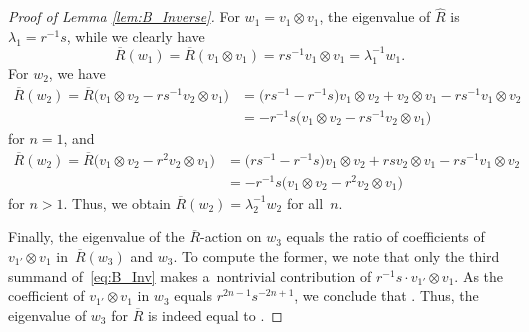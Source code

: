 \documentclass[10pt,a4paper]{amsart}
\numberwithin{equation}{section}
\begin{document}
\begin{proof}[Proof of Lemma \ref{lem:B_Inverse}]
For $w_{1} = v_{1} \otimes v_{1}$, the eigenvalue of $\hat{R}$ is $\lambda_1=r^{-1}s$, while we clearly have
\begin{displaymath}
 \overline{R}(w_1)=\overline{R}(v_{1} \otimes v_{1}) = rs^{-1} v_{1} \otimes v_{1}=\lambda^{-1}_1 w_1 .
\end{displaymath}
For $w_{2}$, we have
\begin{displaymath}
\begin{split}
 \overline{R}(w_{2}) = \overline{R}\bigl(v_{1} \otimes v_{2} - rs^{-1}v_{2} \otimes v_{1}\bigr) &=
 \bigl(rs^{-1} - r^{-1}s\bigr)v_{1} \otimes v_{2} + v_{2} \otimes v_{1} - rs^{-1}v_{1} \otimes v_{2} \\
 &=
 -r^{-1}s\bigl(v_{1} \otimes v_{2} - rs^{-1}v_{2} \otimes v_{1}\bigr)
\end{split}
\end{displaymath}
for $n = 1$, and
\begin{displaymath}
\begin{split}
 \overline{R}(w_{2}) = \overline{R}\bigl(v_{1} \otimes v_{2} - r^{2}v_{2} \otimes v_{1}\bigr) &=
 \bigl(rs^{-1} - r^{-1}s\bigr)v_{1} \otimes v_{2} + rsv_{2} \otimes v_{1} - rs^{-1}v_{1} \otimes v_{2} \\
 &=
 -r^{-1}s\bigl(v_{1} \otimes v_{2} - r^{2}v_{2} \otimes v_{1}\bigr)
\end{split}
\end{displaymath}
for $n > 1$.  Thus, we obtain $\overline{R}(w_{2})=\lambda_2^{-1} w_2$ for all~$n$.

Finally, the eigenvalue of the $\overline{R}$-action on $w_3$ equals the ratio of coefficients of $v_{1'}\otimes v_{1}$ in~$\overline{R}(w_3)$ and $w_3$. To compute the former, we note that only the third summand of~\eqref{eq:B_Inv} makes a~nontrivial contribution of $r^{-1}s\cdot v_{1'}\otimes v_{1}$. As the coefficient of $v_{1'}\otimes v_{1}$ in $w_3$ equals $r^{2n - 1}s^{-2n + 1}$, we conclude that . Thus, the eigenvalue of $w_3$ for $\overline{R}$ is indeed equal to .
\end{proof}
\end{document}
